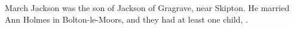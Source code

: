 
March Jackson was the son of Jackson of Gragrave, near Skipton.  He married Ann Holmes in Bolton-le-Moors, and they had at least one child, .
